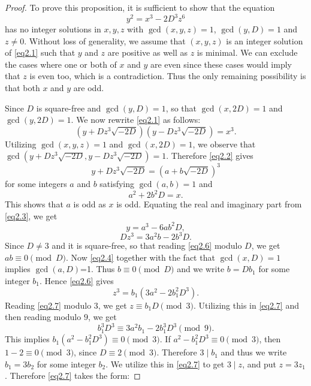 \documentclass[12pt, 14paper,reqno]{amsart}
\theoremstyle{plain}
\theoremstyle{proof}
\numberwithin{equation}{section}
\begin{document}
\begin{proof}
To prove this proposition, it is sufficient to show that the equation 
\begin{equation}\label{eq2.1}
y^2=x^3-2D^3z^6
\end{equation}
has no integer solutions in $x,y,z$ with $\gcd(x, y, z)=1$, $\gcd(y,D)=1$ and $z\ne 0$. Without loss of generality, we assume that $(x,y,z)$ is an integer solution of \eqref{eq2.1} such that $y$ and $z$ are positive as well as $z$ is minimal. We can exclude the cases where one or both of $x$ and $y$ are even since these cases would imply that $z$ is even too, which is a contradiction. Thus the only remaining possibility is that both $x$ and $y$ are odd.

Since $D$ is square-free and $\gcd(y,D)=1$, so that $\gcd(x,2D)=1$ and $\gcd(y,2D)=1$. 
We now rewrite \eqref{eq2.1} as follows:
\begin{equation}\label{eq2.2}
\left(y+Dz^3\sqrt{-2D}\right)\left(y-Dz^3\sqrt{-2D}\right)=x^3.
\end{equation} 
Utilizing $\gcd(x,y,z)=1$ and $\gcd(x,2D)=1$, we observe that $\gcd(y+Dz^3\sqrt{-2D}, y-Dz^3\sqrt{-2D})=1$. 
Therefore \eqref{eq2.2} gives 
\begin{equation}\label{eq2.3}
y+Dz^3\sqrt{-2D}=\left(a+b\sqrt{-2D}\right)^3
\end{equation}
for some integers $a$ and $b$ satisfying $\gcd(a,b)=1$ and 
\begin{equation}\label{eq2.4}
a^2+2b^2D=x.
\end{equation}
This shows that $a$ is odd as $x$ is odd. 
Equating the real and imaginary part from \eqref{eq2.3}, we get
\begin{equation}\label{eq2.5}
y=a^3-6ab^2D,
\end{equation}
\begin{equation}\label{eq2.6}
Dz^3=3a^2b-2b^3D.
\end{equation}
Since $D\ne 3$ and it is square-free, so that reading \eqref{eq2.6} modulo $D$, we get $ab\equiv 0\pmod D$. Now \eqref{eq2.4} together with the fact that $\gcd(x,D)=1$ implies $\gcd(a, D)$=1. Thus $b\equiv 0\pmod D$ and we write $b=Db_1$ for some integer $b_1$. Hence \eqref{eq2.6} gives
\begin{equation}\label{eq2.7}
z^3=b_1(3a^2-2b_1^2D^3).
\end{equation}
Reading \eqref{eq2.7} modulo $3$, we get $z\equiv b_1D\pmod 3$.
Utilizing this in \eqref{eq2.7} and then reading modulo $9$, we get
$$b_1^3D^3\equiv 3a^2b_1-2b_1^3D^3\pmod 9.$$
This implies $b_1(a^2-b_1^2D^3)\equiv 0\pmod 3$. If $a^2-b_1^2D^3\equiv 0\pmod 3$, then $1-2\equiv 0 \pmod 3$, since $D\equiv 2\pmod 3$.  Therefore $3\mid b_1$ and thus we write $b_1=3b_2$ for some integer $b_2$. We utilize this in \eqref{eq2.7} to get $3\mid z$, and put $z=3z_1$. Therefore \eqref{eq2.7} takes the form:

\end{proof}
\end{document}

